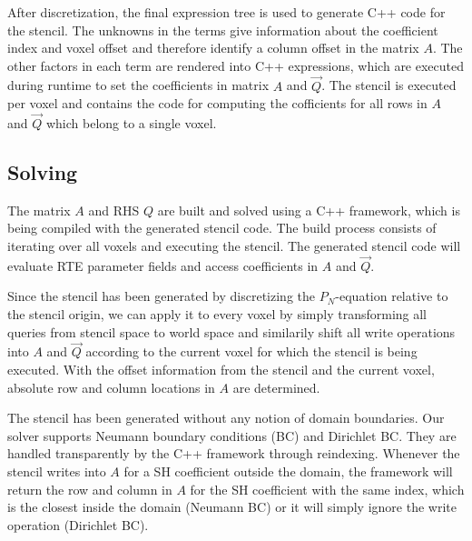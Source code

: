 \begin{figure}[h]
\centering
\begin{subfigure}{0.45\columnwidth}
\end{subfigure}%
\hspace{0.05\columnwidth}
\begin{subfigure}{0.45\columnwidth}
\end{subfigure}%
\label{fig:artefacts}
\end{figure}

After discretization, the final expression tree is used to generate C++ code for the stencil. The unknowns in the terms give information about the coefficient index and voxel offset and therefore identify a column offset in the matrix $A$. The other factors in each term are rendered into C++ expressions, which are executed during runtime to set the coefficients in matrix $A$ and $\vec{Q}$. The stencil is executed per voxel and contains the code for computing the cofficients for all rows in $A$ and $\vec{Q}$ which belong to a single voxel.

\subsection{Solving}

The matrix $A$ and RHS $Q$ are built and solved using a C++ framework, which is being compiled with the generated stencil code. The build process consists of iterating over all voxels and executing the stencil. The generated stencil code will evaluate RTE parameter fields and access coefficients in $A$ and $\vec{Q}$.

Since the stencil has been generated by discretizing the $P_N$-equation relative to the stencil origin, we can apply it to every voxel by simply transforming all queries from stencil space to world space and similarily shift all write operations into $A$ and $\vec{Q}$ according to the current voxel for which the stencil is being executed. With the offset information from the stencil and the current voxel, absolute row and column locations in $A$ are determined.

The stencil has been generated without any notion of domain boundaries. Our solver supports Neumann boundary conditions (BC) and Dirichlet BC. They are handled transparently by the C++ framework through reindexing. Whenever the stencil writes into $A$ for a SH coefficient outside the domain, the framework will return the row and column in $A$ for the SH coefficient with the same index, which is the closest inside the domain (Neumann BC) or it will simply ignore the write operation (Dirichlet BC).


